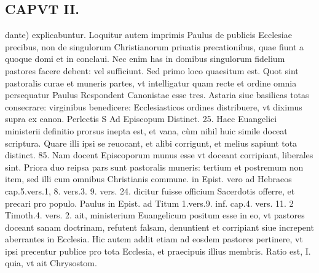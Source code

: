 \documentclass{article}
\begin{document}
\begin{pages}
\section*{CAPVT II. }
\marginpar{[ p.39 ]}\pstart dante) explicabuntur.  \pend\pstart Loquitur autem imprimis Paulus de publicis Ecclesiae precibus, non de singulorum Christianorum priuatis precationibus, quae fiunt a quoque domi et in conclaui. Nec enim has in domibus singulorum fidelium pastores facere debent: vel sufficiunt.  \pend\pstart Sed primo loco quaesitum est. Quot sint pastoralis curae et muneris partes, vt intelligatur quam recte et ordine omnia persequatur Paulus Respondent Canonistae esse tres. Astaria siue basilicas totas consecrare: virginibus benedicere: Ecclesiasticos ordines distribuere, vt diximus supra ex canon. Perlectis S Ad Episcopum Distinct. 25. Haec Euangelici ministerii definitio prorsus inepta est, et vana, cùm nihil huic simile doceat scriptura. Quare illi ipsi se reuocant, et alibi corrigunt, et melius sapiunt tota distinct. 85. Nam docent Episcoporum munus esse vt doceant corripiant, liberales sint. Priora duo reipsa pars sunt pastoralis muneris: tertium et postremum non item, sed illi cum omnibus Christianis commune. in Epist. vero ad Hebraeos cap.5.vers.1, 8. vers.3. 9. vers. 24. dicitur fuisse officium Sacerdotis offerre, et precari pro populo. Paulus in Epist. ad Titum 1.vers.9. inf. cap.4. vers. 11. 2 Timoth.4. vers. 2. ait, ministerium Euangelicum positum esse in eo, vt pastores doceant sanam doctrinam, refutent falsam, denuntient et corripiant siue increpent aberrantes in Ecclesia. Hic autem addit etiam ad eosdem pastores pertinere, vt ipsi precentur publice pro tota Ecclesia, et praecipuis illius membris. Ratio est, I. quia, vt ait Chrysostom.  \pend

\end{pages}
\end{document}
